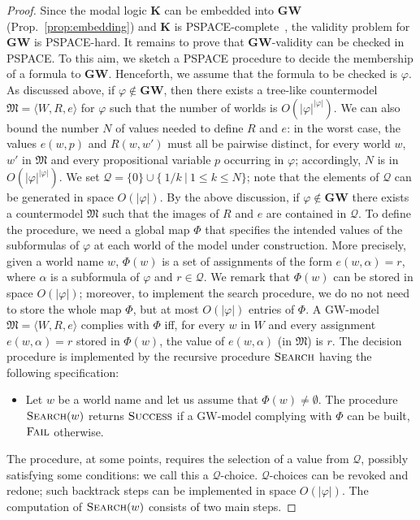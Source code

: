 \documentclass[copyright,creativecommons]{eptcs}
\newcommand{\GWL}{\mathbf{GW}}
\newcommand{\GWM}{\mbox{$\mathrm{GW}$}}
\newcommand{\KL}{\mathbf{K}}
\newcommand{\stru}[1]{\langle #1 \rangle} %
\newcommand{\size}[1]{|#1|}
\newcommand{\M}{\mathfrak{M}}
\newcommand{\Search}{\textsc{Search}}
\newcommand{\Success}{\textsc{Success}}
\newcommand{\Fail}{\textsc{Fail}}
\renewcommand{\a}{\alpha}
\newcommand{\Qcal}{\mathcal{Q}}
\begin{document}
\begin{proof}
  Since the modal logic $\KL$ can be embedded into $\GWL$
  (Prop.~\ref{prop:embedding}) and $\KL$ is
  PSPACE-complete~\cite{Ladner:77}, the validity problem for $\GWL$ is
  PSPACE-hard.  It remains to prove that $\GWL$-validity can be
  checked in PSPACE.  To this aim, we sketch a PSPACE procedure to
  decide the membership of a formula to $\GWL$.  Henceforth, we assume
  that the formula to be checked is $\varphi$.  As discussed above, if
  $\varphi\not\in\GWL$, then there exists a tree-like countermodel
  $\M=\stru{W,R,e}$ for $\varphi$ such that the number of worlds is
  $O(\size{\varphi}^{\size{\varphi}})$.  We can also bound the number
  $N$ of values needed to define $R$ and $e$: in the worst case, the
  values $e(w,p)$ and $R(w,w')$ must all be pairwise distinct, for
  every world $w$, $w'$ in $\M$ and every propositional variable $p$
  occurring in $\varphi$; accordingly, $N$ is in
  $O(\size{\varphi}^{\size{\varphi}})$.  We set
  $\Qcal=\{0\}\cup\{~1/k~|~1\leq k\leq N\}$; note that the elements of
  $\Qcal$ can be generated in space $O(\size{\varphi})$.  By the above
  discussion, if $\varphi\not\in\GWL$ there exists a countermodel $\M$
  such that the images of $R$ and $e$ are contained in $\Qcal$.  To
  define the procedure, we need a global map $\Phi$ that specifies the
  intended values of the subformulas of $\varphi$ at each world of the
  model under construction.  More precisely, given a world name $w$,
  $\Phi(w)$ is a set of assignments of the form $e(w,\a)=r$, where
  $\a$ is a subformula of $\varphi$ and $r\in\Qcal$. We remark that
  $\Phi(w)$ can be stored in space $O(|\varphi|)$; moreover, to
  implement the search procedure, we do no not need to store the whole
  map $\Phi$, but at most $O(\size{\varphi})$ entries of $\Phi$.  A
  $\GWM$-model $\M=\stru{W,R,e}$ complies with $\Phi$ iff, for every
  $w$ in $W$ and every assignment $e(w,\a)=r$ stored in $\Phi(w)$, the
  value of $e(w,\a)$ (in $\M$) is $r$.  The decision procedure is
  implemented by the recursive procedure $\Search$ having the
  following specification:

\begin{itemize}
\item Let $w$ be a world name and let us assume that $\Phi(w)\neq
  \emptyset$.  The procedure $\Search(w)$ returns $\Success$ if a
  $\GWM$-model complying with $\Phi$ can be built, $\Fail$ otherwise.
\end{itemize}

\noindent
The procedure, at some points, requires the selection of a value from
$\Qcal$, possibly satisfying some conditions: we call this a
$\Qcal$-choice.  $\Qcal$-choices can be revoked and redone; such
backtrack steps can be implemented in space $O(\size{\varphi})$.  The
computation of $\Search(w)$ consists of two main steps.


\end{proof}
\end{document}

